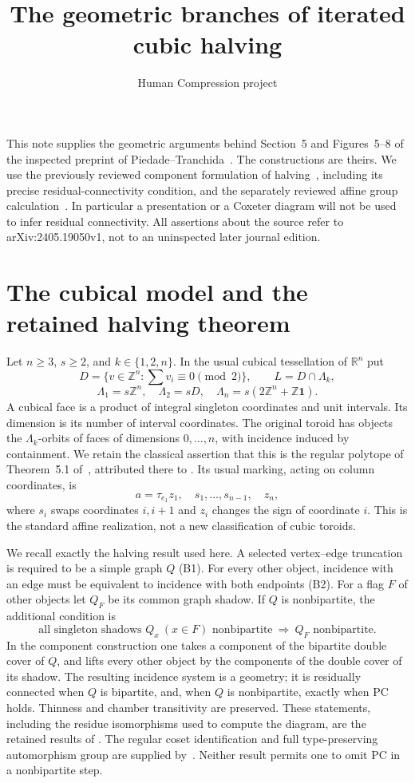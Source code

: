 \documentclass[11pt,a4paper]{article}
\title{The geometric branches of iterated cubic halving}
\author{Human Compression project}
\date{}
\newcommand{\Z}{\mathbb Z}
\newcommand{\one}{\mathbf1}
\begin{document}
\maketitle

This note supplies the geometric arguments behind Section~5 and
Figures~5--8 of the inspected preprint of Piedade--Tranchida~\cite{PT}.
The constructions are theirs. We use the previously reviewed
component formulation of halving~\cite{Parity}, including its precise
residual-connectivity condition, and the separately reviewed affine
group calculation~\cite{Affine}. In particular a presentation or a
Coxeter diagram will not be used to infer residual connectivity.
All assertions about the source refer to arXiv:2405.19050v1,
not to an uninspected later journal edition.

\section{The cubical model and the retained halving theorem}
Let $n\ge3$, $s\ge2$, and $k\in\{1,2,n\}$. In the usual cubical
tessellation of $\mathbb R^n$ put
\[
 D=\{v\in\Z^n:\textstyle\sum v_i\equiv0\pmod2\},\qquad
 L=D\cap\Lambda_k,
\]
\[
 \Lambda_1=s\Z^n,\quad\Lambda_2=sD,\quad
 \Lambda_n=s(2\Z^n+\Z\one).
\]
A cubical face is a product of integral singleton coordinates and
unit intervals. Its dimension is its number of interval coordinates.
The original toroid has objects the $\Lambda_k$-orbits of faces of
dimensions $0,\ldots,n$, with incidence induced by containment.
We retain the classical assertion that this is the regular polytope
of Theorem~5.1 of~\cite{PT}, attributed there to
\cite[Theorem~6D4]{MS}. Its usual marking, acting on column
coordinates, is
\[
 a=\tau_{e_1}z_1,\quad s_1,\ldots,s_{n-1},\quad z_n,
\]
where $s_i$ swaps coordinates $i,i+1$ and $z_i$ changes the sign of
coordinate $i$. This is the standard affine realization, not a new
classification of cubic toroids.

We recall exactly the halving result used here. A selected vertex--edge
truncation is required to be a simple graph $Q$ (B1). For every other
object, incidence with an edge must be equivalent to incidence with
both endpoints (B2). For a flag $F$ of other objects let $Q_F$ be its
common graph shadow. If $Q$ is nonbipartite, the additional condition is
\[
 \tag{PC}
 \text{all singleton shadows }Q_x\ (x\in F)\text{ nonbipartite}
 \ \Longrightarrow\ Q_F\text{ nonbipartite}.
\]
In the component construction one takes a component of the bipartite
double cover of $Q$, and lifts every other object by the components of
the double cover of its shadow. The resulting incidence system is a
geometry; it is residually connected when $Q$ is bipartite, and, when
$Q$ is nonbipartite, exactly when PC holds. Thinness and chamber
transitivity are preserved. These statements, including the residue
isomorphisms used to compute the diagram, are the retained results of
\cite{Parity}. The regular coset identification and full type-preserving
automorphism group are supplied by~\cite{Coset}. Neither result permits
one to omit PC in a nonbipartite step.
\end{document}
